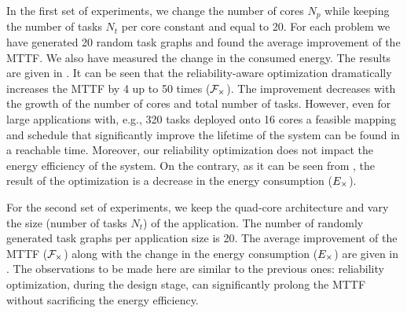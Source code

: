 In the first set of experiments, we change the number of cores $N_p$ while keeping the number of tasks $N_t$ per core constant and equal to 20. For each problem we have generated 20 random task graphs and found the average improvement of the MTTF. We also have measured the change in the consumed energy. The results are given in . It can be seen that the reliability-aware optimization dramatically increases the MTTF by 4 up to 50 times ($\mathcal{F}_{\times}$). The improvement decreases with the growth of the number of cores and total number of tasks. However, even for large applications with, e.g., 320 tasks deployed onto 16 cores a feasible mapping and schedule that significantly improve the lifetime of the system can be found in a reachable time. Moreover, our reliability optimization does not impact the energy efficiency of the system. On the contrary, as it can be seen from , the result of the optimization is a decrease in the energy consumption ($E_{\times}$).

For the second set of experiments, we keep the quad-core architecture and vary the size (number of tasks $N_t$) of the application. The number of randomly generated task graphs per application size is 20. The average improvement of the MTTF ($\mathcal{F}_{\times}$) along with the change in the energy consumption ($E_{\times}$) are given in . The observations to be made here are similar to the previous ones: reliability optimization, during the design stage, can significantly prolong the MTTF without sacrificing the energy efficiency.

